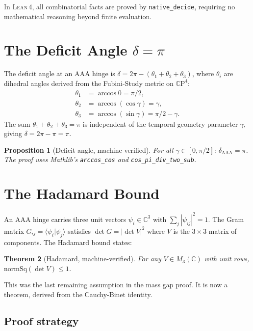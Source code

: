 \documentclass[12pt]{article}
\newtheorem{theorem}{Theorem}[section]
\newtheorem{proposition}[theorem]{Proposition}
\theoremstyle{definition}
\theoremstyle{remark}
\newcommand{\CC}{\mathbb{C}}
\newcommand{\normSq}{\mathrm{normSq}}
\newcommand{\Lean}{\textsc{Lean\,4}}
\begin{document}
In \Lean{}, all combinatorial facts are proved by
\texttt{native\_decide}, requiring no mathematical
reasoning beyond finite evaluation.

\section{The Deficit Angle $\delta = \pi$}

The deficit angle at an AAA hinge is
$\delta = 2\pi - (\theta_1 + \theta_2 + \theta_3)$,
where $\theta_i$ are dihedral angles derived from the
Fubini-Study metric on $\CC\mathrm{P}^4$:
\begin{align}
  \theta_1 &= \arccos 0 = \pi/2, \\
  \theta_2 &= \arccos(\cos\gamma) = \gamma, \\
  \theta_3 &= \arccos(\sin\gamma) = \pi/2 - \gamma.
\end{align}
The sum $\theta_1 + \theta_2 + \theta_3 = \pi$ is
independent of the temporal geometry parameter $\gamma$,
giving $\delta = 2\pi - \pi = \pi$.

\begin{proposition}[Deficit angle, machine-verified]
For all $\gamma \in [0, \pi/2]$:
$\delta_{\mathrm{AAA}} = \pi$.
The proof uses Mathlib's \texttt{arccos\_cos} and
\texttt{cos\_pi\_div\_two\_sub}.
\end{proposition}

\section{The Hadamard Bound}

An AAA hinge carries three unit vectors
$\psi_i \in \CC^3$ with $\sum_j |\psi_{ij}|^2 = 1$.
The Gram matrix $G_{ij} = \langle\psi_i|\psi_j\rangle$
satisfies $\det G = |\det V|^2$ where $V$ is the
$3\times 3$ matrix of components.
The Hadamard bound states:

\begin{theorem}[Hadamard, machine-verified]\label{thm:hadamard}
For any $V \in M_3(\CC)$ with unit rows,
$\normSq(\det V) \le 1$.
\end{theorem}

This was the last remaining assumption in the mass gap
proof. It is now a theorem, derived from the
Cauchy-Binet identity.

\subsection{Proof strategy}
\end{document}
